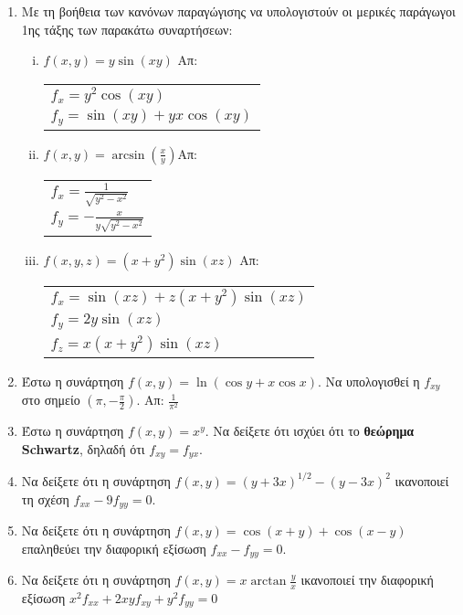 \begin{enumerate}
  \item Με τη βοήθεια των κανόνων παραγώγισης να υπολογιστούν οι μερικές 
    παράγωγοι 1ης τάξης των παρακάτω συναρτήσεων:

    \begin{enumerate}[i)]
      \item $f(x,y)=y\sin (xy)$ \hfill Απ: \begin{tabular}{l}
          $f_x=y^2\cos(xy)$ \\ 
          $f_y=\sin(xy)+yx\cos(xy)$
        \end{tabular}

      \item $f(x,y)=\arcsin(\frac{x}{y})$\hfill Απ: \begin{tabular}{l}
          $f_x=\frac{1}{\sqrt{y^2-x^2}}$ \\ 
          $f_y=-\frac{x}{y\sqrt{y^2-x^2}}$
        \end{tabular}
      \item $ f(x,y,z) = (x+y^{2}) \sin{(xz)} $ \hfill Απ: \begin{tabular}{l}
          $ f_{x} = \sin{(xz)} + z(x+y^{2}) \sin{(xz)} $ \\
          $ f_{y} = 2y \sin{(xz)} $ \\
          $ f_{z} = x(x+y^{2}) \sin{(xz)} $
        \end{tabular} 
    \end{enumerate}

  \item Έστω η συνάρτηση $f(x,y)=\ln\left(\cos y+x\cos x\right)$.  Να υπολογισθεί 
    η $ f_{xy} $ στο σημείο $\left(\pi,-\frac{\pi}{2}\right)$.
    \hfill Απ: $\frac{1}{\pi^2}$

  \item Έστω η συνάρτηση $ f(x,y) = x^{y} $. Να δείξετε ότι ισχύει ότι το
    \textbf{θεώρημα Schwartz}, δηλαδή ότι $ f_{xy} = f_{yx} $.
  \item Να δείξετε ότι η συνάρτηση $ f(x,y) = (y+3x)^{1/2} - 
    (y-3x)^{2} $ ικανοποιεί τη σχέση $ f_{xx} - 9 f_{yy} = 0 $.
  \item Να δείξετε ότι η συνάρτηση $ f(x,y) = \cos{(x+y)} + \cos{(x-y)} $ 
    επαληθεύει την διαφορική εξίσωση $ f_{xx} - f_{yy} = 0 $.

  \item Να δείξετε ότι η συνάρτηση $ f(x,y) = x \arctan{\frac{y}{x}} $ 
    ικανοποιεί την διαφορική εξίσωση $ x^{2} f_{xx} + 2xyf_{xy} + y^{2} f_{yy} = 0 $ 
\end{enumerate}

